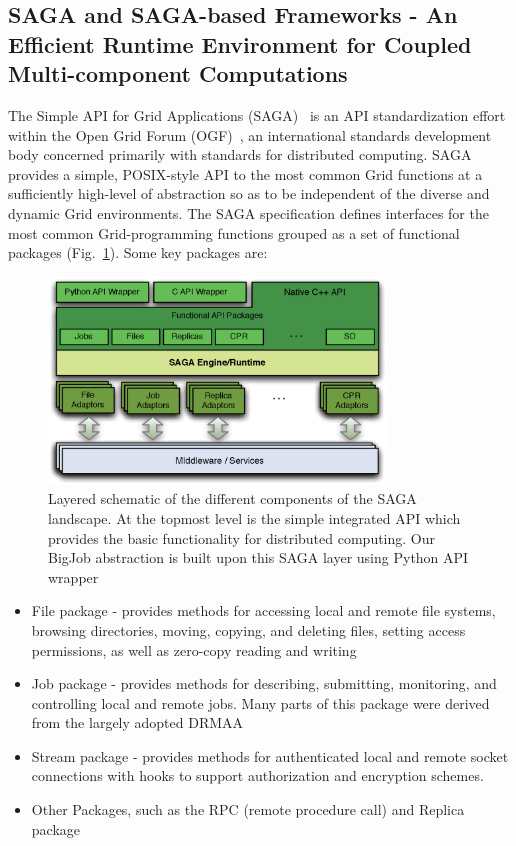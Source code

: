 \documentclass[preprint,12pt]{elsarticle}
\begin{document}
\subsection{SAGA and SAGA-based Frameworks - An Efficient Runtime Environment for Coupled Multi-component Computations}

The Simple API for Grid Applications (SAGA)~\cite{saga_web} is an API standardization effort within the Open Grid Forum (OGF)~\cite{ogf_web}, an international standards development body concerned primarily with standards for distributed computing. SAGA provides a simple, POSIX-style API to the most common Grid functions at a sufficiently high-level of abstraction so as to be independent of the diverse and dynamic Grid environments. The SAGA specification defines interfaces for the most common Grid-programming functions grouped as a set of functional packages (Fig.~\ref{Fig:SAGA1}). Some key packages are:

\begin{figure}
 \begin{center}
     \includegraphics[width=0.8\textwidth]{Structure_of_SAGA.eps}
 \end{center}
\caption{\small Layered schematic of the different components of the SAGA landscape. At the topmost level is the simple integrated API which provides the basic functionality for distributed computing. Our BigJob abstraction is built upon this SAGA layer using Python API wrapper}
 \label{Fig:SAGA1}
 \vspace{-1em}
\end{figure}

\begin{itemize}
\item File package - provides methods for accessing local and remote file systems, browsing directories, moving, copying, and deleting files, setting access permissions, as well as zero-copy reading and writing
\item Job package - provides methods for describing, submitting, monitoring, and controlling local and remote jobs. Many parts of this package were derived from the largely adopted DRMAA %
\item Stream package - provides methods for authenticated local and remote socket connections with hooks to support authorization and encryption schemes.
\item Other Packages, such as the RPC (remote procedure call) and Replica package
\end{itemize}
\end{document}
